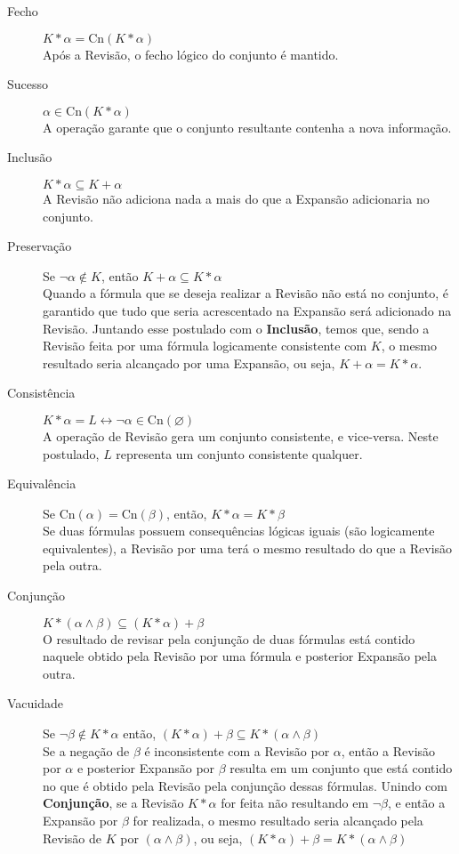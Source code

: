 \begin{description}
	\item[Fecho] $ K \ast \alpha = \text{Cn}(K \ast \alpha) $ \\ Após a Revisão, o fecho lógico do conjunto é mantido.
	\item[Sucesso] $ \alpha \in \text{Cn}(K \ast \alpha) $ \\ A operação garante que o conjunto resultante contenha a nova informação.
	\item[Inclusão] $ K \ast \alpha \subseteq K + \alpha $ \\ A Revisão não adiciona nada a mais do que a Expansão adicionaria no conjunto.
	\item[Preservação] Se $ \lnot \alpha \notin K $, então $ K + \alpha \subseteq K \ast \alpha $ \\ Quando a fórmula que se deseja realizar a Revisão não está no conjunto, é garantido que tudo que seria acrescentado na Expansão será adicionado na Revisão. Juntando esse postulado com o \textbf{Inclusão}, temos que, sendo a Revisão feita por uma fórmula logicamente consistente com $ K $, o mesmo resultado seria alcançado por uma Expansão, ou seja, $ K + \alpha = K \ast \alpha $. 
	\item[Consistência] $ K \ast \alpha = L \leftrightarrow \lnot \alpha \in \text{Cn}(\varnothing)$ \\ A operação de Revisão gera um conjunto consistente, e vice-versa. Neste postulado, $ L $ representa um conjunto consistente qualquer.
	\item[Equivalência] Se $ \text{Cn}(\alpha) = \text{Cn}(\beta) $, então, $ K \ast \alpha = K \ast \beta $ \\ Se duas fórmulas possuem consequências lógicas iguais (são logicamente equivalentes), a Revisão por uma terá o mesmo resultado do que a Revisão pela outra.
	\item[Conjunção] $ K \ast (\alpha \land \beta) \subseteq (K \ast \alpha) + \beta $ \\ O resultado de revisar pela conjunção de duas fórmulas está contido naquele obtido pela Revisão por uma fórmula e posterior Expansão pela outra.
	\item[Vacuidade] Se $ \lnot \beta \notin K \ast \alpha $ então, $ (K \ast \alpha) + \beta \subseteq K \ast (\alpha \land \beta) $ \\ Se a negação de $ \beta $ é inconsistente com a Revisão por $ \alpha $, então a Revisão por $ \alpha $ e posterior Expansão por $ \beta $ resulta em um conjunto que está contido no que é obtido pela Revisão pela conjunção dessas fórmulas. Unindo com \textbf{Conjunção}, se a Revisão $ K \ast \alpha $ for feita não resultando em $ \lnot \beta $, e então a Expansão por $ \beta $ for realizada, o mesmo resultado seria alcançado pela Revisão de $ K $ por $ (\alpha \land \beta) $, ou seja, $ (K \ast \alpha) + \beta = K \ast (\alpha \land \beta) $    
\end{description}

